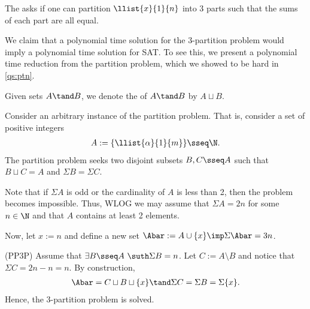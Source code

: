 \documentclass{article}
\begin{document}

\begin{subexercise}\label{qs:3ptn}
  The  asks if one can partition $ \llist{x}{1}{n} $ into 3 parts such that the sums of each part are all equal.
\end{subexercise}

\begin{solution}
  We claim that a polynomial time solution for the 3-partition problem would imply a polynomial time solution for SAT.
  To see this, we present a polynomial time reduction from the partition problem, which we showed to be hard in \ref{qs:ptn}.

  \begin{notation}
  Given sets $ A \tand B$, we denote the  of $ A\tand B $ by $ A\sqcup B $.
  \end{notation}

  Consider an arbitrary instance of the partition problem.
  That is, consider a set of positive integers \begin{align*}
    A := \{\llist{\alpha}{1}{m}\} \sseq \N.
  \end{align*}
  The partition problem seeks two disjoint subsets $ B,C\sseq A $ such that $ B\sqcup C = A $ and $ \Sigma B = \Sigma C $.

  Note that if $ \Sigma A $ is odd or the cardinality of $ A $ is less than 2, then the problem becomes impossible.
  Thus, WLOG we may assume that $ \Sigma A = 2n $ for some $ n\in \N $ and that $ A $ contains at least 2 elements.

  Now, let $ x := n $ and define a new set $ \Abar := A\cup \{x\}\imp \Sigma \Abar = 3n $.

  \begin{subproof}[Correctness.]
    (PP\imp 3P)
    Assume that $ \exists B\sseq A\ \suth \Sigma B = n $.
    Let $ C := A \setminus B $ and notice that $ \Sigma C = 2n - n = n $.
    By construction,
    \begin{align*}
      \Abar = C\sqcup  B \sqcup \{x\} \tand \Sigma C = \Sigma B = \Sigma \{x\}.
    \end{align*}
    Hence, the 3-partition problem is solved.


\end{subproof}
\end{solution}
\end{document}
